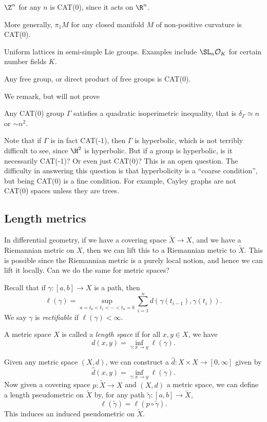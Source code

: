 \documentclass[a4paper]{article}
\begin{document}
\begin{eg}
  $\Z^n$ for any $n$ is CAT(0), since it acts on $\R^n$.
\end{eg}

\begin{eg}
  More generally, $\pi_1 M$ for any closed manifold $M$ of non-positive curvature is CAT(0).
\end{eg}

\begin{eg}
  Uniform lattices in semi-simple Lie groups. Examples include $\SL_n \mathcal{O}_K$ for certain number fields $K$.
\end{eg}
\begin{eg}
  Any free group, or direct product of free groups is CAT(0).
\end{eg}

We remark, but will not prove
\begin{prop}
  Any CAT(0) group $\Gamma$ satisfies a quadratic isoperimetric inequality, that is $\delta_\Gamma \simeq n$ or $\sim n^2$.
\end{prop}

Note that if $\Gamma$ is in fact CAT(-1), then $\Gamma$ is hyperbolic, which is not terribly difficult to see, since $\H^2$ is hyperbolic. But if a group is hyperbolic, is it necessarily CAT(-1)? Or even just CAT(0)? This is an open question. The difficulty in answering this question is that hyperbolicity is a ``coarse condition'', but being CAT(0) is a fine condition. For example, Cayley graphs are not CAT(0) spaces unless they are trees.

\subsection{Length metrics}
In differential geometry, if we have a covering space $\tilde{X} \to X$, and we have a Riemannian metric on $X$, then we can lift this to a Riemannian metric to $\tilde{X}$. This is possible since the Riemannian metric is a purely local notion, and hence we can lift it locally. Can we do the same for metric spaces?

Recall that if $\gamma: [a, b] \to X$ is a path, then
\[
  \ell(\gamma) = \sup_{a = t_0 < t_1 < \cdots < t_n = b} \sum_{i = 1}^n d(\gamma(t_{i - 1}), \gamma(t_i)).
\]
We say $\gamma$ is \emph{rectifiable} if $\ell(\gamma) < \infty$.

\begin{defi}
  A metric space $X$ is called a \emph{length space} if for all $x, y \in X$, we have
  \[
    d(x, y) = \inf_{\gamma: x \to y} \ell(\gamma).
  \]
\end{defi}
Given any metric space $(X, d)$, we can construct a  $\hat{d}: X \times X \to [0, \infty]$ given by
\[
  \hat{d}(x, y) = \inf_{\gamma: x \to y} \ell(\gamma).
\]
Now given a covering space $p: \tilde{X} \to X$ and $(X, d)$ a metric space, we can define a length pseudometric on $\tilde{X}$ by, for any path $\tilde{\gamma}: [a, b] \to \tilde{X}$,
\[
  \ell(\tilde{\gamma}) = \ell(p \circ \tilde{\gamma}).
\]
This induces an induced pseudometric on $\tilde{X}$.
\end{document}
